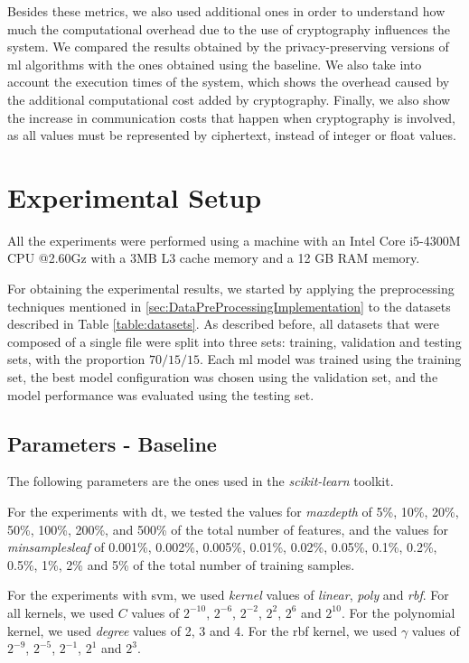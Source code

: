 Besides these metrics, we also used additional ones in order to understand how much the computational overhead due to the use of cryptography influences the system.
We compared the results obtained by the privacy-preserving versions of \ac{ml} algorithms with the ones obtained using the baseline. We also take into account the execution times of the system, which shows the overhead caused by the additional computational cost added by cryptography.
Finally, we also show the increase in communication costs that happen when cryptography is involved, as all values must be represented by ciphertext, instead of integer or float values.


\section{Experimental Setup}
\label{sec:ExperimentalSetup}

All the experiments were performed using a machine with an Intel Core i5-4300M CPU @2.60Gz with a 3MB L3 cache memory and a 12 GB RAM memory.

For obtaining the experimental results, we started by applying the preprocessing techniques mentioned in \ref{sec:DataPreProcessingImplementation} to the datasets described in Table \ref{table:datasets}. As described before, all datasets that were composed of a single file were split into three sets: training, validation and testing sets, with the proportion $70/15/15$. Each \ac{ml} model was trained using the training set, the best model configuration was chosen using the validation set, and the model performance was evaluated using the testing set.

\subsection{Parameters - Baseline}

The following parameters are the ones used in the \textit{scikit-learn} toolkit.

For the experiments with \ac{dt}, we tested the values for \textit{max\textunderscore depth} of 5\%, 10\%, 20\%, 50\%, 100\%, 200\%, and 500\% of the total number of features, and the values for \textit{min\textunderscore samples\textunderscore leaf} of 0.001\%, 0.002\%, 0.005\%, 0.01\%, 0.02\%, 0.05\%, 0.1\%, 0.2\%, 0.5\%, 1\%, 2\% and 5\% of the total number of training samples.

For the experiments with \ac{svm}, we used \textit{kernel} values of \textit{linear}, \textit{poly} and \textit{rbf}. For all kernels, we used $C$ values of $2^{-10}$, $2^{-6}$, $2^{-2}$, $2^{2}$, $2^{6}$ and $2^{10}$. For the polynomial kernel, we used \textit{degree} values of 2, 3 and 4. For the \ac{rbf} kernel, we used $\gamma$ values of $2^{-9}$, $2^{-5}$, $2^{-1}$, $2^{1}$ and $2^{3}$.

